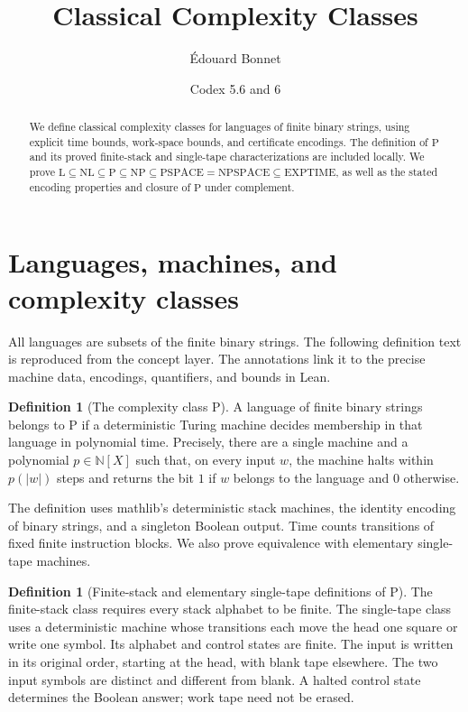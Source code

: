 \documentclass[11pt]{article}
\title{Classical Complexity Classes}
\author{\'{E}douard Bonnet \and Codex 5.6 and 6}
\date{}
\theoremstyle{definition}
\newtheorem{definition}[theorem]{Definition}
\begin{document}
\maketitle
\begin{abstract}
We define classical complexity classes for languages of finite binary strings,
using explicit time bounds, work-space bounds, and certificate encodings.
The definition of $\mathrm P$ and its proved finite-stack and single-tape
characterizations are included locally. We prove
$\mathrm L\subseteq\mathrm{NL}\subseteq\mathrm P\subseteq\mathrm{NP}\subseteq\mathrm{PSPACE}=\mathrm{NPSPACE}\subseteq\mathrm{EXPTIME}$,
as well as the stated encoding properties and closure of $\mathrm P$ under
complement.
\end{abstract}

\section{Languages, machines, and complexity classes}
All languages are subsets of the finite binary strings. The following
definition text is reproduced from the concept layer. The annotations link
it to the precise machine data, encodings, quantifiers, and bounds in Lean.

\begin{definition}[The complexity class P]\leavevmode
A language of finite binary strings belongs to $\mathrm{P}$ if a deterministic
Turing machine decides membership in that language in polynomial time.
Precisely, there are a single machine and a polynomial $p \in \mathbb{N}[X]$
such that, on every input $w$, the machine halts within $p(|w|)$ steps and
returns the bit $1$ if $w$ belongs to the language and $0$ otherwise.

The definition uses mathlib's deterministic stack machines, the identity
encoding of binary strings, and a singleton Boolean output. Time counts
transitions of fixed finite instruction blocks. We also prove equivalence
with elementary single-tape machines.
\end{definition}

\begin{definition}[Finite-stack and elementary single-tape definitions of P]\leavevmode
The finite-stack class requires every stack alphabet to be finite. The
single-tape class uses a deterministic machine whose transitions each move
the head one square or write one symbol. Its alphabet and control states
are finite. The input is
written in its original order, starting at the head, with blank tape elsewhere.
The two input symbols are distinct and different from blank. A halted control
state determines the Boolean answer; work tape need not be erased.
\end{definition}
\end{document}
